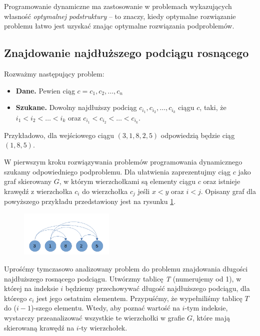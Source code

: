 Programowanie dynamiczne ma zastosowanie w problemach wykazujących 
własność \emph{optymalnej podstruktury} –
to znaczy, kiedy optymalne rozwiązanie problemu 
łatwo jest uzyskać znając optymalne rozwiązania podproblemów. 

\subsection{Znajdowanie najdłuższego podciągu rosnącego}
Rozważmy następujący problem: 
\begin{itemize}
	\item[] \textbf{Dane.} Pewien ciąg $c = c_1,c_2, \ldots, c_n$
	\item[] \textbf{Szukane.} Dowolny najdłuższy podciąg 
	$c_{i_1},c_{i_2},\ldots, c_{i_k}$ ciągu $c$, taki, że
	$i_1 < i_2 < \ldots < i_k$ oraz $c_{i_1} < c_{i_2} < \ldots < c_{i_k}$.    
\end{itemize}

Przykładowo, dla wejściowego ciągu $(3, 1, 8, 2, 5)$ odpowiedzią będzie
ciąg $(1, 8, 5)$.

W pierwszym kroku rozwiązywania problemów programowania dynamicznego szukamy
odpowiedniego podproblemu. Dla ułatwienia zaprezentujmy ciąg $c$ jako 
graf skierowany $G$, w którym wierzchołkami są elementy ciągu $c$ oraz 
istnieje krawędź z wierzchołka $c_i$ do wierzchołka $c_j$ jeśli $x < y$
oraz $i < j$. 
Opisany graf dla powyższego przykładu przedstawiony jest na rysunku
\ref{fig:example111_max_length}.

\begin{figure}[H]
	\centering
	\includegraphics[width=0.4\textwidth]{data/prblm1_ex_graph.png}
	\caption{ }
	\label{fig:example111_max_length}
\end{figure}

Uprośćmy tymczasowo analizowany problem do problemu znajdowania 
długości najdłuższego rosnącego podciągu. Utwórzmy tablicę \textit{T} 
(numerujemy od 1), w której na indeksie $i$ 
będziemy przechowywać długość najdłuższego podciągu, dla którego $c_i$
jest jego ostatnim elementem. Przypuśćmy, że wypełniliśmy tablicę 
$T$ do ($i-1$)-szego elementu.
Wtedy, aby poznać wartość na $i$-tym indeksie, wystarczy przeanalizować 
wszystkie te wierzchołki w grafie $G$, które mają skierowaną krawędź na
$i$-ty wierzchołek.

